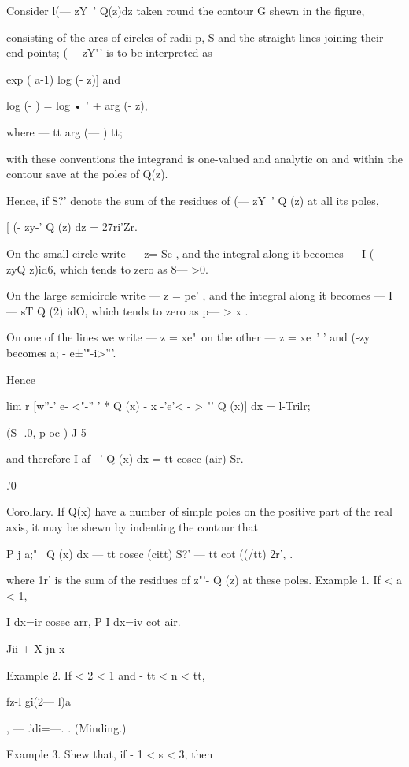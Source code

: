 %
%

Consider l(— zY~' Q(z)dz taken round the contour G shewn in the
figure,

consisting of the arcs of circles of radii p, S and the straight lines
joining their end points; (— zY"' is to be interpreted as

exp ( a-1) log (- z)] and

log (- ) = log • ' + arg (- z),

where — tt arg (— ) tt;

with these conventions the integrand is one-valued and analytic on and
within the contour save at the poles of Q(z).

Hence, if S?' denote the sum of the residues of (— zY~' Q (z) at all
its poles,

[ (- zy-' Q (z) dz = 27ri'Zr.

On the small circle write — z= Se , and the integral along it becomes
— I (— zyQ z)id6, which tends to zero as 8— >0.

On the large semicircle write — z = pe' , and the integral along it
becomes — I — sT Q (2) idO, which tends to zero as p— > x .

On one of the lines we write — z = xe"\ on the other — z = xe~' ' and
(-zy~ becomes a; - e±'"-i>'''.

Hence

lim r [w''-' e- <"-'' ' * Q (x) - x -'e'< - > "' Q (x)] dx = l-Trilr;

(S- .0, p oc ) J 5

and therefore I af ~' Q (x) dx = tt cosec (air) Sr.

.'0

Corollary. If Q(x) have a number of simple poles on the positive part
of the real axis, it may be shewn by indenting the contour that

P j a;"~ Q (x) dx — tt cosec (citt) S?' — tt cot ((/tt) 2r', .

where 1r' is the sum of the residues of z"'- Q (z) at these poles.
Example 1. If < a < 1,

I dx=ir cosec arr, P I dx=iv cot air.

Jii + X jn x

%
%

Example 2. If < 2 < 1 and - tt < n < tt,

  

fz-l gi(2— l)a

, — .'di=—. . (Minding.)

Example 3. Shew that, if - 1 < s < 3, then

